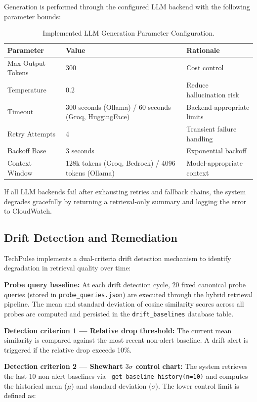 Generation is performed through the configured LLM backend with the following parameter bounds:

\begin{table}[H]
\caption{Implemented LLM Generation Parameter Configuration.}
\label{tab:llm_params}
\centering
\begin{tabular}{p{3.0cm}p{5.5cm}p{4.0cm}}
\toprule
\textbf{Parameter} & \textbf{Value} & \textbf{Rationale} \\
\midrule
Max Output Tokens & 300 & Cost control \\
Temperature & 0.2 & Reduce hallucination risk \\
Timeout & 300 seconds (Ollama) / 60 seconds (Groq, HuggingFace) & Backend-appropriate limits \\
Retry Attempts & 4 & Transient failure handling \\
Backoff Base & 3 seconds & Exponential backoff \\
Context Window & 128k tokens (Groq, Bedrock) / 4096 tokens (Ollama) & Model-appropriate context \\
\bottomrule
\end{tabular}
\end{table}

If all LLM backends fail after exhausting retries and fallback chains, the system degrades gracefully by returning a retrieval-only summary and logging the error to CloudWatch.

\subsection{Drift Detection and Remediation}
\label{sec:drift}

TechPulse implements a dual-criteria drift detection mechanism to identify degradation in retrieval quality over time:

\textbf{Probe query baseline:} At each drift detection cycle, 20 fixed canonical probe queries (stored in \texttt{probe\_queries.json}) are executed through the hybrid retrieval pipeline. The mean and standard deviation of cosine similarity scores across all probes are computed and persisted in the \texttt{drift\_baselines} database table.

\textbf{Detection criterion 1 --- Relative drop threshold:} The current mean similarity is compared against the most recent non-alert baseline. A drift alert is triggered if the relative drop exceeds 10\%.

\textbf{Detection criterion 2 --- Shewhart $3\sigma$ control chart:} The system retrieves the last 10 non-alert baselines via \texttt{\_get\_baseline\_history(n=10)} and computes the historical mean ($\mu$) and standard deviation ($\sigma$). The lower control limit is defined as:

